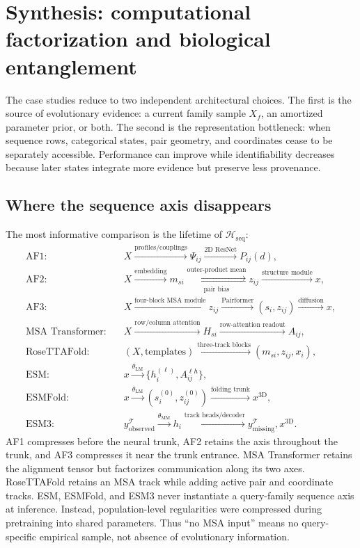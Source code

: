 \documentclass[10pt]{article}
\begin{document}
\section{Synthesis: computational factorization and biological entanglement}

The case studies reduce to two independent architectural choices.  The first is the source of
evolutionary evidence: a current family sample $X_f$, an amortized parameter prior, or both.  The
second is the representation bottleneck: when sequence rows, categorical states, pair geometry,
and coordinates cease to be separately accessible.  Performance can improve while identifiability
decreases because later states integrate more evidence but preserve less provenance.

\subsection{Where the sequence axis disappears}

The most informative comparison is the lifetime of $\mathcal H_{\mathrm{seq}}$:
\begin{align}
\text{AF1:}\quad
&X
\xrightarrow{\text{profiles/couplings}}
\Psi_{ij}
\xrightarrow{\text{2D ResNet}}
P_{ij}(d),\\
\text{AF2:}\quad
&X
\xrightarrow{\text{embedding}}
m_{si}
\mathrel{\overset{\text{outer-product mean}}
{\underset{\text{pair bias}}{\rightleftarrows}}}
z_{ij}
\xrightarrow{\text{structure module}}
x,\\
\text{AF3:}\quad
&X
\xrightarrow{\text{four-block MSA module}}
z_{ij}
\xrightarrow{\text{Pairformer}}
(s_i,z_{ij})
\xrightarrow{\text{diffusion}}
x,\\
\text{MSA Transformer:}\quad
&X\xrightarrow{\text{row/column attention}}H_{si}
\xrightarrow{\text{row-attention readout}}A_{ij},\\
\text{RoseTTAFold:}\quad
&(X,\text{templates})\xrightarrow{\text{three-track blocks}}
(m_{si},z_{ij},x_i),\\
\text{ESM:}\quad
&x
\xrightarrow{\theta_{\mathrm{LM}}}
\{h_i^{(\ell)},A_{ij}^{\ell h}\},\\
\text{ESMFold:}\quad
&x
\xrightarrow{\theta_{\mathrm{LM}}}
(s_i^{(0)},z_{ij}^{(0)})
\xrightarrow{\text{folding trunk}}
x^{\mathrm{3D}},\\
\text{ESM3:}\quad
&y_{\mathrm{observed}}^{\mathcal T}
\xrightarrow{\theta_{\mathrm{MM}}}h_i
\xrightarrow{\text{track heads/decoder}}
y_{\mathrm{missing}}^{\mathcal T},x^{\mathrm{3D}}.
\end{align}
AF1 compresses before the neural trunk, AF2 retains the axis throughout the trunk, and AF3
compresses it near the trunk entrance.  MSA Transformer retains the alignment tensor but
factorizes communication along its two axes.  RoseTTAFold retains an MSA track while adding active
pair and coordinate tracks.  ESM, ESMFold, and ESM3 never instantiate a query-family sequence axis
at inference.  Instead, population-level regularities were compressed during pretraining into
shared parameters.  Thus ``no MSA input'' means no query-specific empirical sample, not absence of
evolutionary information.
\end{document}
